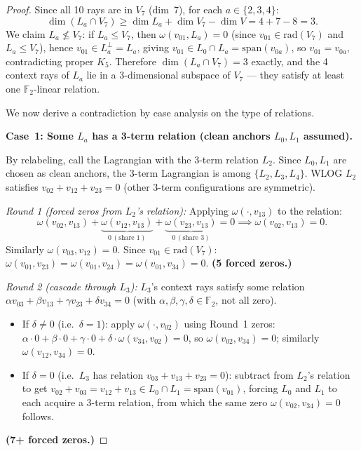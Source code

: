 \documentclass[11pt,a4paper]{article}
\theoremstyle{remark}
\begin{document}
\begin{proof}
\medskip
Since all 10 rays are in $V_7$ (dim~7), for each $a \in \{2,3,4\}$:
\[
  \dim(L_a \cap V_7) \geq \dim L_a + \dim V_7 - \dim V = 4 + 7 - 8 = 3.
\]
We claim $L_a \not\leq V_7$: if $L_a \leq V_7$, then $\omega(v_{01}, L_a) = 0$
(since $v_{01} \in \mathrm{rad}(V_7)$ and $L_a \leq V_7$), hence
$v_{01} \in L_a^\perp = L_a$, giving $v_{01} \in L_0 \cap L_a = \mathrm{span}(v_{0a})$,
so $v_{01} = v_{0a}$, contradicting proper $K_5$.
Therefore $\dim(L_a \cap V_7) = 3$ exactly, and the 4 context rays of $L_a$
lie in a 3-dimensional subspace of $V_7$ — they satisfy at least one
$\mathbb{F}_2$-linear relation.

We now derive a contradiction by case analysis on the type of relations.

\medskip
\noindent\textbf{Case~1: Some $L_a$ has a 3-term relation (clean anchors $L_0, L_1$ assumed).}

By relabeling, call the Lagrangian with the 3-term relation $L_2$.
Since $L_0, L_1$ are chosen as clean anchors, the 3-term Lagrangian is
among $\{L_2, L_3, L_4\}$.
WLOG $L_2$ satisfies $v_{02} + v_{12} + v_{23} = 0$
(other 3-term configurations are symmetric).

\textit{Round 1 (forced zeros from $L_2$'s relation):}
Applying $\omega(\cdot, v_{13})$ to the relation:
\[
  \omega(v_{02}, v_{13}) + \underbrace{\omega(v_{12}, v_{13})}_{0\,(\text{share }1)}
  + \underbrace{\omega(v_{23}, v_{13})}_{0\,(\text{share }3)} = 0
  \implies \omega(v_{02}, v_{13}) = 0.
\]
Similarly $\omega(v_{03}, v_{12}) = 0$.
Since $v_{01} \in \mathrm{rad}(V_7)$:
$\omega(v_{01}, v_{23}) = \omega(v_{01}, v_{24}) = \omega(v_{01}, v_{34}) = 0$.
\textbf{(5 forced zeros.)}

\textit{Round 2 (cascade through $L_3$):}
$L_3$'s context rays satisfy some relation $\alpha v_{03} + \beta v_{13} + \gamma v_{23} + \delta v_{34} = 0$
(with $\alpha,\beta,\gamma,\delta \in \mathbb{F}_2$, not all zero).
\begin{itemize}
  \item If $\delta \neq 0$ (i.e.\ $\delta = 1$): apply $\omega(\cdot, v_{02})$ using Round~1 zeros:
  $\alpha \cdot 0 + \beta \cdot 0 + \gamma \cdot 0 + \delta \cdot \omega(v_{34}, v_{02}) = 0$,
  so $\omega(v_{02}, v_{34}) = 0$; similarly $\omega(v_{12}, v_{34}) = 0$.
  \item If $\delta = 0$ (i.e.\ $L_3$ has relation $v_{03} + v_{13} + v_{23} = 0$):
  subtract from $L_2$'s relation to get
  $v_{02} + v_{03} = v_{12} + v_{13} \in L_0 \cap L_1 = \mathrm{span}(v_{01})$,
  forcing $L_0$ and $L_1$ to each acquire a 3-term relation, from which the same
  zero $\omega(v_{02}, v_{34}) = 0$ follows.
\end{itemize}
\textbf{(7+ forced zeros.)}


\end{proof}
\end{document}
